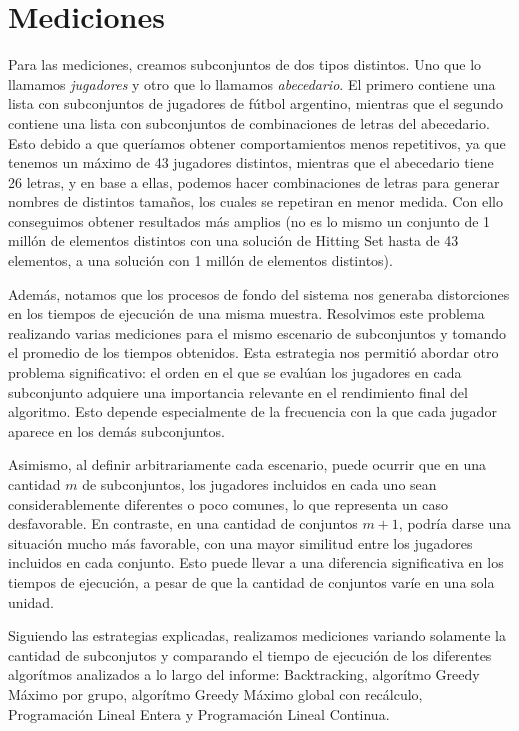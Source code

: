 \section{Mediciones}

Para las mediciones, creamos subconjuntos de dos tipos distintos. Uno que lo llamamos \textit{jugadores} y otro que lo llamamos \textit{abecedario}.
El primero contiene una lista con subconjuntos de jugadores de fútbol argentino, mientras que el segundo contiene una lista con subconjuntos de combinaciones de letras del abecedario. Esto debido a que queríamos obtener comportamientos menos repetitivos, ya que tenemos un máximo de 43 jugadores distintos, mientras que el abecedario tiene 26 letras, y en base a ellas, podemos hacer combinaciones de letras para generar nombres de distintos tamaños, los cuales se repetiran en menor medida.
Con ello conseguimos obtener resultados más amplios (no es lo mismo un conjunto de 1 millón de elementos distintos con una solución de Hitting Set hasta de 43 elementos, a una solución con 1 millón de elementos distintos).

Además, notamos que los procesos de fondo del sistema nos generaba distorciones en los tiempos de ejecución de una misma muestra. Resolvimos este problema
realizando varias mediciones para el mismo escenario de subconjuntos y tomando el promedio de los tiempos obtenidos. Esta estrategia nos permitió abordar otro problema significativo: el orden en el que se evalúan los jugadores en cada subconjunto adquiere una importancia relevante en el rendimiento final del algoritmo. Esto depende especialmente de la frecuencia con la que cada jugador aparece en los demás subconjuntos. 

Asimismo, al definir arbitrariamente cada escenario, puede ocurrir que en una cantidad 
$m$ de subconjuntos, los jugadores incluidos en cada uno sean considerablemente diferentes o poco comunes, lo que representa un caso desfavorable. En contraste, en una cantidad de conjuntos $m+1$, podría darse una situación mucho más favorable, con una mayor similitud entre los jugadores incluidos en cada conjunto. Esto puede llevar a una diferencia significativa en los tiempos de ejecución, a pesar de que la cantidad de conjuntos varíe en una sola unidad.

Siguiendo las estrategias explicadas, realizamos mediciones variando solamente la cantidad de subconjutos y comparando el tiempo de ejecución de los diferentes algorítmos analizados a lo largo del informe: Backtracking, algorítmo Greedy Máximo por grupo, algorítmo Greedy Máximo global con recálculo, Programación Lineal Entera y Programación Lineal Continua.

